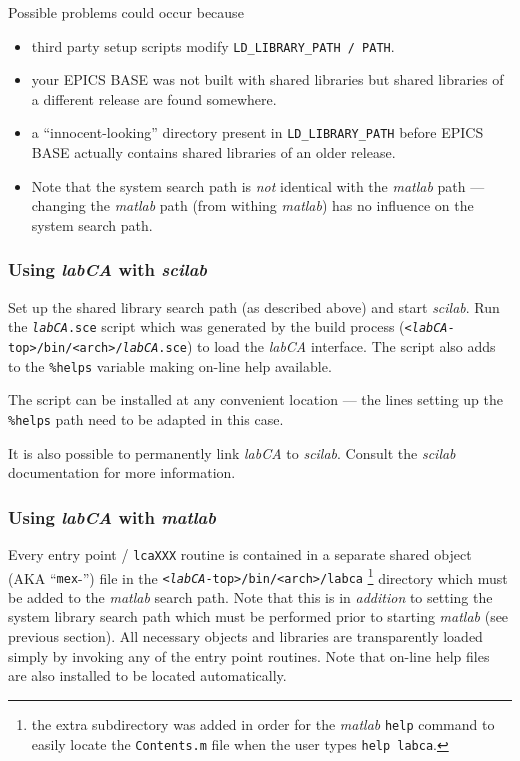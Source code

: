 \documentclass{article}
\newcommand{\sca}{\ita{labCA}}
\newcommand{\scilab}{\ita{scilab}}
\newcommand{\matlab}{\ita{matlab}}
\newcommand{\com}[1]{{\tt #1}}
\newcommand{\ita}[1]{\emph{#1}}
\begin{document}
Possible problems could occur because
\begin{itemize}
\item third party setup scripts modify \com{LD\_LIBRARY\_PATH / PATH}.
\item your EPICS BASE was not built with shared libraries but shared libraries
of a different release are found somewhere.
\item a ``innocent-looking'' directory present in \com{LD\_LIBRARY\_PATH}
before EPICS BASE actually contains shared libraries of an older release.
\item Note that the system search path is \ita{not} identical with the
\matlab{} path --- changing the \matlab{} path (from withing \matlab)
has no influence on the system search path.
\end{itemize}

\subsubsection{Using \sca{} with \scilab}
Set up the shared library search path (as described above) and start
\scilab. Run the \com{\sca.sce} script which was generated by the build process
(\com{<\sca-top>/bin/<arch>/\sca.sce}) to load the \sca{} interface.
The script also adds to the \com{\%helps} variable making on-line
help available.

The script can be installed at any convenient location --- the lines
setting up the \com{\%helps} path need to be adapted in this case.

It is also possible to permanently link \sca{} to \scilab{}. Consult
the \scilab{} documentation for more information.

\subsubsection{Using \sca{} with \matlab}
Every entry point / \com{lcaXXX} routine 
is contained in a separate
shared object (AKA ``\com{mex}-'') file in the \com{<\sca-top>/bin/<arch>/labca}%
\footnote{
the extra subdirectory was added in order for the \matlab{} \com{help} command
to easily locate the \com{Contents.m} file when the user types \com{help labca}.
} directory
which must be added to the \matlab{} search path.
Note that this is in \ita{addition}
to setting the system library search path which must be performed prior
to starting \matlab{} (see previous section).
All necessary objects and libraries are transparently loaded simply
by invoking any of the entry point routines. Note that on-line help
files are also installed to be located automatically.
\end{document}
